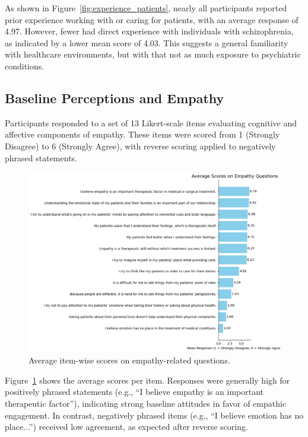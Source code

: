 As shown in Figure~\ref{fig:experience_patients}, nearly all participants reported prior experience working with or caring for patients, with an average response of 4.97. However, fewer had direct experience with individuals with schizophrenia, as indicated by a lower mean score of 4.03. This suggests a general familiarity with healthcare environments, but with that not as much exposure to psychiatric conditions.

\subsection{Baseline Perceptions and Empathy}

Participants responded to a set of 13 Likert-scale items evaluating cognitive and affective components of empathy. These items were scored from 1 (Strongly Disagree) to 6 (Strongly Agree), with reverse scoring applied to negatively phrased statements.

\begin{figure}[H]
    \centering
    \includegraphics[width=\columnwidth]{../../Figures/avg-scores-pre.png}
    \caption{Average item-wise scores on empathy-related questions.}
    \label{fig:avg_scores_pre}
\end{figure}

Figure~\ref{fig:avg_scores_pre} shows the average scores per item. Responses were generally high for positively phrased statements (e.g., “I believe empathy is an important therapeutic factor”), indicating strong baseline attitudes in favor of empathic engagement. In contrast, negatively phrased items (e.g., “I believe emotion has no place...”) received low agreement, as expected after reverse scoring.

